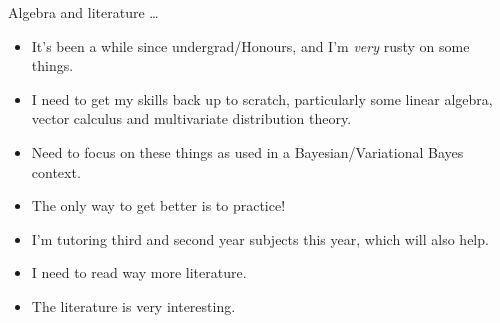 \documentclass{beamer}
\begin{document}
\begin{frame}{Algebra and literature \ldots}

\begin{itemize}
\item It's been a while since undergrad/Honours, and I'm \emph{very} rusty on some things.
\item I need to get my skills back up to scratch, particularly some linear algebra, vector calculus and
			multivariate distribution theory.
\item Need to focus on these things as used in a Bayesian/Variational Bayes context.
\item The only way to get better is to practice!
\item I'm tutoring third and second year subjects this year, which will also help.
\item I need to read way more literature.
\item The literature is very interesting.

\end{itemize}
\end{frame}
\end{document}
